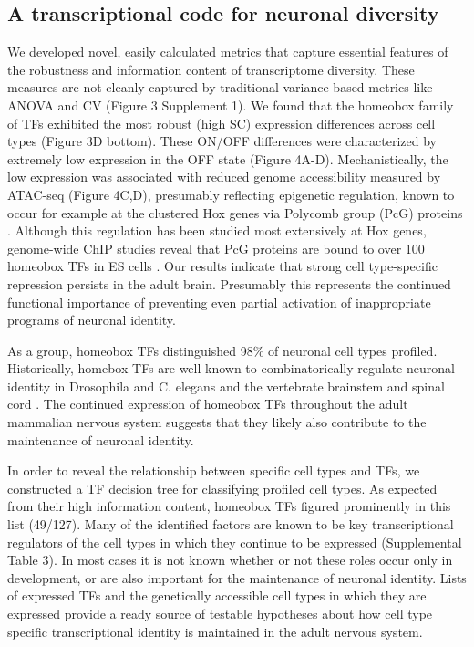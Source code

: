 \subsection{A transcriptional code for neuronal diversity}
We developed novel, easily calculated metrics that capture essential features of the robustness and information content of transcriptome diversity. These measures are not cleanly captured by traditional variance-based metrics like ANOVA and CV (Figure 3 Supplement 1). We found that the homeobox family of TFs exhibited the most robust (high SC) expression differences across cell types (Figure 3D bottom). These ON/OFF differences were characterized by extremely low expression in the OFF state (Figure 4A-D). Mechanistically, the low expression was associated with reduced genome accessibility measured by ATAC-seq (Figure 4C,D), presumably reflecting epigenetic regulation, known to occur for example at the clustered Hox genes via Polycomb group (PcG) proteins \citep{Montavon_2014}. Although this regulation has been studied most extensively at Hox genes, genome-wide ChIP studies reveal that PcG proteins are bound to over 100 homeobox TFs in ES cells \citep{Boyer_2006}. Our results indicate that strong cell type-specific repression persists in the adult brain. Presumably this represents the continued functional importance of preventing even partial activation of inappropriate programs of neuronal identity. 

As a group, homeobox TFs distinguished 98\% of neuronal cell types profiled. Historically, homebox TFs are well known to combinatorically regulate neuronal identity in Drosophila and C. elegans \citep{Kratsios_2017} and the vertebrate brainstem and spinal cord \citep{Dasen_2009,Philippidou_2013}. The continued expression of homeobox TFs throughout the adult mammalian nervous system suggests that they likely also contribute to the maintenance of neuronal identity.

In order to reveal the relationship between specific cell types and TFs, we constructed a TF decision tree for classifying profiled cell types. As expected from their high information content, homeobox TFs figured prominently in this list (49/127). Many of the identified factors are known to be key transcriptional regulators of the cell types in which they continue to be expressed (Supplemental Table 3). In most cases it is not known whether or not these roles occur only in development, or are also important for the maintenance of neuronal identity. Lists of expressed TFs and the genetically accessible cell types in which they are expressed provide a ready source of testable hypotheses about how cell type specific transcriptional identity is maintained in the adult nervous system.

